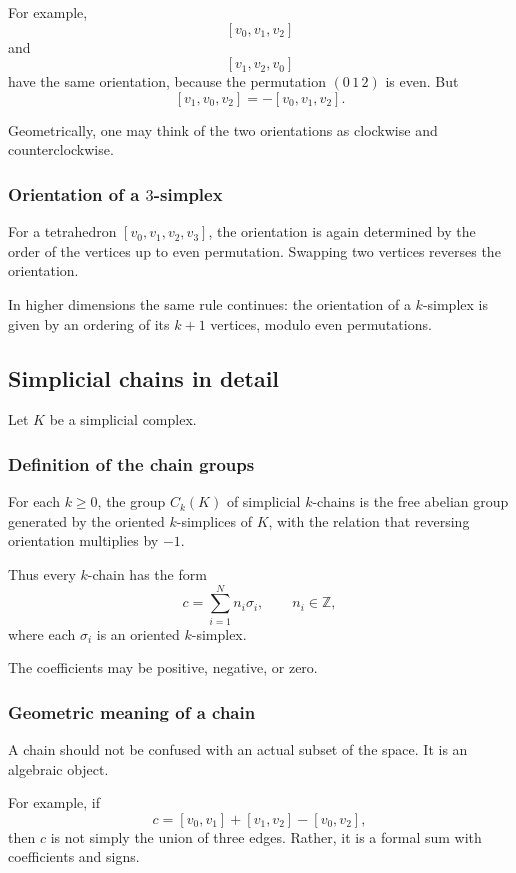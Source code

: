 \documentclass[12pt,a4paper]{article}
\theoremstyle{notespace}
\begin{document}
For example,
\[
[v_0,v_1,v_2]
\]
and
\[
[v_1,v_2,v_0]
\]
have the same orientation, because the permutation \((0\,1\,2)\) is even. But
\[
[v_1,v_0,v_2]
=
-[v_0,v_1,v_2].
\]

Geometrically, one may think of the two orientations as clockwise and counterclockwise.

\subsubsection{Orientation of a \texorpdfstring{$3$}{3}-simplex}

For a tetrahedron \([v_0,v_1,v_2,v_3]\), the orientation is again determined by the order of the vertices up to even permutation. Swapping two vertices reverses the orientation.

In higher dimensions the same rule continues: the orientation of a \(k\)-simplex is given by an ordering of its \(k+1\) vertices, modulo even permutations.

\subsection{Simplicial chains in detail}

Let \(K\) be a simplicial complex.

\subsubsection{Definition of the chain groups}

For each \(k\ge 0\), the group \(C_k(K)\) of simplicial \(k\)-chains is the free abelian group generated by the oriented \(k\)-simplices of \(K\), with the relation that reversing orientation multiplies by \(-1\).

Thus every \(k\)-chain has the form
\[
c = \sum_{i=1}^N n_i \sigma_i,
\qquad n_i\in \mathbb{Z},
\]
where each \(\sigma_i\) is an oriented \(k\)-simplex.

The coefficients may be positive, negative, or zero.

\subsubsection{Geometric meaning of a chain}

A chain should not be confused with an actual subset of the space. It is an algebraic object.

For example, if
\[
c = [v_0,v_1] + [v_1,v_2] - [v_0,v_2],
\]
then \(c\) is not simply the union of three edges. Rather, it is a formal sum with coefficients and signs.
\end{document}
